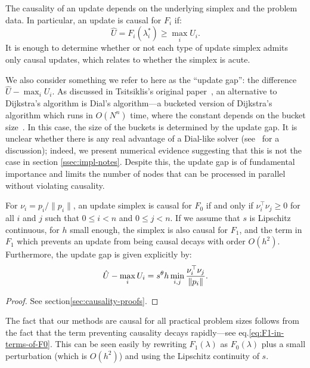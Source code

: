 \documentclass[smallcondensed]{svjour3}
\begin{document}
The causality of an update depends on the underlying simplex and the
problem data. In particular, an update is causal for $F_i$ if:
\begin{equation}
  \hat{U} = F_i(\lambda_i^*) \geq \max_i U_i.
\end{equation}
It is enough to determine whether or not each type of update simplex
admits only causal updates, which relates to whether the simplex is
acute.

We also consider something we refer to here as the ``update gap'': the
difference $\hat{U} - \max_i U_i$. As discussed in Tsitsiklis's
original paper~\cite{tsitsiklis1995efficient}, an alternative to
Dijkstra's algorithm is Dial's algorithm---a bucketed version of
Dijkstra's algorithm which runs in $O(N^n)$ time, where the constant
depends on the bucket size~\cite{dial1969algorithm,kim2001calo}. In
this case, the size of the buckets is determined by the update gap. It
is unclear whether there is any real advantage of a Dial-like solver
(see~\cite{jeong2008fast} for a discussion); indeed, we present
numerical evidence suggesting that this is not the case in section\@
\ref{ssec:impl-notes}. Despite this, the update gap is of fundamental
importance and limits the number of nodes that can be processed in
parallel without violating causality.

\begin{theorem}\label{thm:causality}
  For $\nu_i = p_i/\|p_i\|$, an update simplex is causal for $F_0$ if
  and only if $\nu_i^\top \nu_j \geq 0$ for all $i$ and $j$ such that
  $0 \leq i < n$ and $0 \leq j < n$. If we assume that $s$ is
  Lipschitz continuous, for $h$ small enough, the simplex is also
  causal for $F_1$, and the term in $F_1$ which prevents an update
  from being causal decays with order $O(h^2)$. Furthermore, the
  update gap is given explicitly by:
  \begin{equation}
    \hat{U} - \max_i U_i = s^\theta h \min_{i, j} \frac{\nu_i^\top \nu_j}{\left\|p_i\right\|}.
  \end{equation}
\end{theorem}

\begin{proof}
  See section\@ \ref{sec:causality-proofs}.
\end{proof}

\noindent The fact that our methods are causal for all practical
problem sizes follows from the fact that the term preventing causality
decays rapidly---see eq.\@ \ref{eq:F1-in-terms-of-F0}. This can be
seen easily by rewriting $F_1(\lambda)$ as $F_0(\lambda)$ plus a small
perturbation (which is $O(h^2)$) and using the Lipschitz continuity of
$s$.
\end{document}
